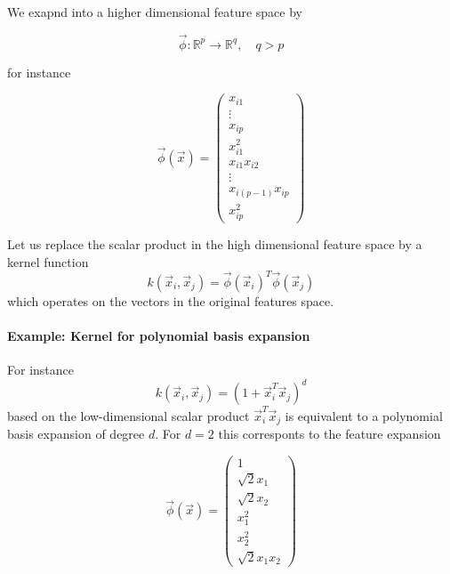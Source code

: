 We exapnd into a higher dimensional feature space by

\begin{equation}
    \vec{\phi} : \mathbb{R}^p \rightarrow \mathbb{R}^q, \quad q > p
\end{equation}

for instance

\begin{equation}
    \vec{\phi}(\vec{x}) = \begin{pmatrix}
    x_{i1} \\ \vdots \\ x_{ip} \\ x_{i1}^2 \\ x_{i1}x_{i2} \\ \vdots \\ x_{i(p-1)}x_{ip} \\ x_{ip}^2
    \end{pmatrix}
\end{equation}

Let us replace the scalar product in the high dimensional feature space by a kernel function
\begin{equation}
    k(\vec{x}_i, \vec{x}_j) = \vec{\phi}(\vec{x}_i)^T \vec{\phi}(\vec{x}_j)
\end{equation}
which operates on the vectors in the original features space.

\paragraph*{Example: Kernel for polynomial basis expansion}
For instance
\begin{equation}
    k(\vec{x}_i, \vec{x}_j) = (1 + \vec{x}_i^T \vec{x}_j)^d
\end{equation}
based on the low-dimensional scalar product $\vec{x}_i^T \vec{x}_j$ is equivalent to a 
polynomial basis expansion of degree $d$. For $d = 2$ this corresponts to the
feature expansion

\begin{equation}
    \vec{\phi}(\vec{x}) = \begin{pmatrix}
    1 \\ \sqrt{2} x_1 \\ \sqrt{2} x_2 \\ x_1^2 \\ x_2^2 \\ \sqrt{2} x_1 x_2
    \end{pmatrix}
\end{equation}

